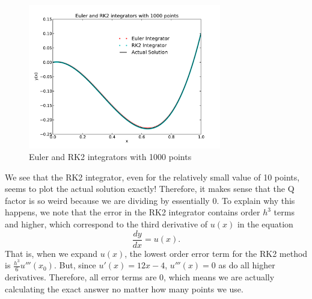 \documentclass[11pt,letterpaper]{article}
\begin{document}
\begin{figure}[bth]
\centering
\includegraphics[width=0.75\textwidth]{1000points.pdf}
\caption{Euler and RK2 integrators with 1000 points}
\label{fig:1000points}
\end{figure}

We see that the RK2 integrator, even for the relatively small value of 10 points,
seems to plot the actual solution exactly! Therefore, it makes sense that the Q factor
is so weird because we are dividing by essentially 0. To explain why this happens, we note 
that the error in the RK2 integrator contains order $h^3$ terms and higher, which
correspond to the third derivative of $u(x)$ in the equation 
$$ \frac{dy}{dx} = u(x). $$
That is, when we expand $u(x)$, the lowest order error term for the RK2 method is 
$\frac{h^3}{6}u'''(x_0)$. But, since $u'(x) = 12x - 4$, $u'''(x) = 0$ as do all higher
derivatives. Therefore, all error terms are 0, which means 
we are actually calculating the exact answer no matter how many points we use.
\end{document}
